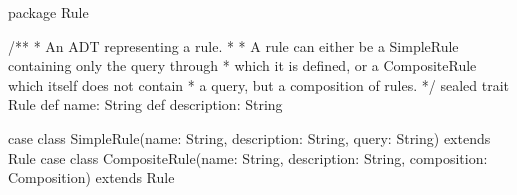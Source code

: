 package Rule

/**
 * An ADT representing a rule.
 *
 * A rule can either be a SimpleRule containing only the query through
 * which it is defined, or a CompositeRule which itself does not contain
 * a query, but a composition of rules.
 */
sealed trait Rule {
  def name: String
  def description: String
}

case class SimpleRule(name: String, description: String, query: String) extends Rule
case class CompositeRule(name: String, description: String, composition: Composition) extends Rule
